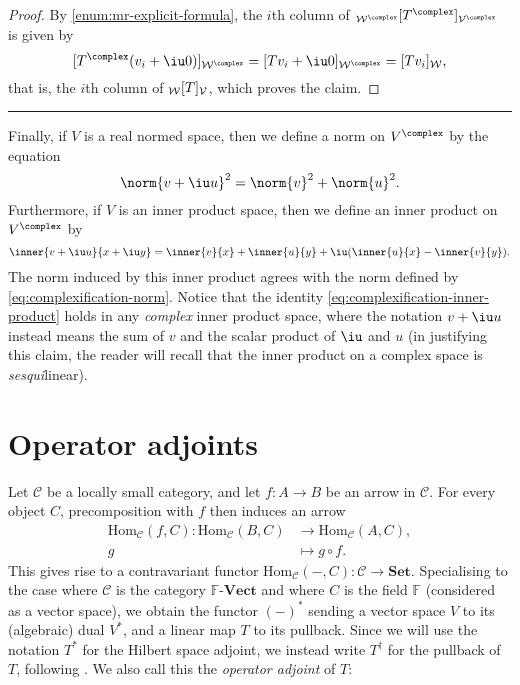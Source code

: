 \documentclass[article, a4paper, 11pt, oneside]{memoir}
\numberwithin{equation}{chapter}
\newcommand{\calV}{\mathcal{V}}
\newcommand{\calW}{\mathcal{W}}
\newcommand{\field}{\mathbb{F}}
\newcommand\fleuronbreak{\fancybreak{\textcolor{linkcolor}{\adfhangingflatleafleft}}}
\begin{document}
\begin{proof}
    By \cref{enum:mr-explicit-formula}, the $i$th column of $\mr{\calW^\complex}{T^\complex}{\calV^\complex}$ is given by
    \begin{equation*}
        \coordvec{T^\complex (v_i + \iu 0)}{\calW^\complex}
            = \coordvec{Tv_i + \iu 0}{\calW^\complex}
            = \coordvec{Tv_i}{\calW},
    \end{equation*}
    that is, the $i$th column of $\mr{\calW}{T}{\calV}$, which proves the claim.
\end{proof}

\fleuronbreak

Finally, if $V$ is a real normed space, then we define a norm on $V^\complex$ by the equation
%
\begin{equation}
    \label{eq:complexification-norm}
    \norm{v + \iu u}^2
        = \norm{v}^2 + \norm{u}^2.
\end{equation}
%
Furthermore, if $V$ is an inner product space, then we define an inner product on $V^\complex$ by
%
\begin{equation}
    \label{eq:complexification-inner-product}
    \inner{v + \iu u}{x + \iu y}
        = \inner{v}{x}
          + \inner{u}{y}
          + \iu (\inner{u}{x} - \inner{v}{y}).
\end{equation}
%
The norm induced by this inner product agrees with the norm defined by \cref{eq:complexification-norm}. Notice that the identity \cref{eq:complexification-inner-product} holds in any \emph{complex} inner product space, where the notation $v + \iu u$ instead means the sum of $v$ and the scalar product of $\iu$ and $u$ (in justifying this claim, the reader will recall that the inner product on a complex space is \emph{sesqui}linear).


\chapter{Operator adjoints}

\newcommand{\calC}{\mathcal{C}}
\renewcommand{\hom}[1][]{\mathrm{Hom}_{#1}}

Let $\calC$ be a locally small category, and let $f \colon A \to B$ be an arrow in $\calC$. For every object $C$, precomposition with $f$ then induces an arrow
%
\begin{align*}
    \hom[\calC](f,C) \colon \hom[\calC](B,C) &\to \hom[\calC](A,C), \\
        g &\mapsto g \circ f.
\end{align*}
%
This gives rise to a contravariant functor $\hom[\calC](-,C) \colon \calC \to \mathbf{Set}$. Specialising to the case where $\calC$ is the category $\field\text{-}\mathbf{Vect}$ and where $C$ is the field $\field$ (considered as a vector space), we obtain the functor $(-)^*$ sending a vector space $V$ to its (algebraic) dual $V^*$, and a linear map $T$ to its pullback. Since we will use the notation $T^*$ for the Hilbert space adjoint, we instead write $T^\dagger$ for the pullback of $T$, following \textcite{follandrealanalysis}. We also call this the \emph{operator adjoint} of $T$:
\end{document}
